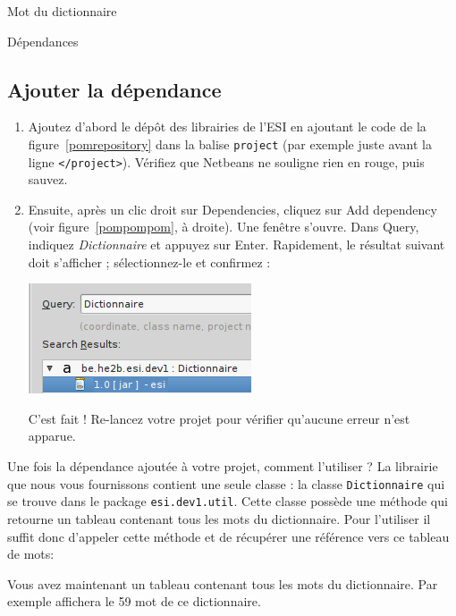 \documentclass[a4paper,11pt]{style-esi/td}
\begin{document}
\begin{Exercice}{Mot du dictionnaire}
\begin{infoit}{Dépendances}
                \medskip
                \subsection*{Ajouter la dépendance}
                \begin{enumerate}
              \item Ajoutez d'abord le dépôt des librairies de l'ESI en ajoutant le code de la figure~\vref{pomrepository} dans la balise \texttt{project} (par exemple juste avant la ligne \texttt{</project>}).
                Vérifiez que Netbeans ne souligne rien en rouge, puis sauvez.

                
              \item Ensuite, après un clic droit sur Dependencies, cliquez sur Add dependency (voir figure~\vref{pompompom}, à droite).
                Une fenêtre s'ouvre.
                Dans Query, indiquez \emph{Dictionnaire} et appuyez sur Enter.
                Rapidement, le résultat suivant doit s'afficher ; sélectionnez-le et confirmez :
                \begin{center}
                \includegraphics[scale=0.6]{resources/add-dependency-2}
                \end{center}
                C'est fait ! Re-lancez votre projet pour vérifier qu'aucune erreur n'est apparue.

              \end{enumerate}
              \end{infoit}

              	Une fois la dépendance ajoutée à votre projet, comment l'utiliser ?
			La librairie que nous vous fournissons contient une seule classe : 
			la classe \texttt{Dictionnaire} qui se trouve dans le package 
			\texttt{esi.dev1.util}. Cette classe possède une méthode 
			 qui retourne un tableau contenant tous les mots
			du dictionnaire. Pour l'utiliser il suffit donc d'appeler cette méthode
			et de récupérer une référence vers ce tableau de mots:
			
			
			Vous avez maintenant un tableau contenant tous les mots du dictionnaire.
			Par exemple  affichera 
			le 59\ieme{} mot de ce dictionnaire.
	\end{Exercice} 
\end{document}
